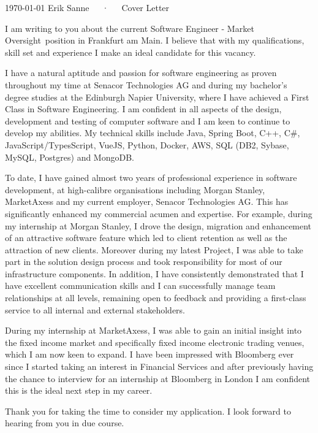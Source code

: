 \documentclass[11pt, a4paper]{awesome-cv}
\newcommand{\role}{Software Engineer - Market Oversight}
\newcommand{\location}{Frankfurt am Main}
\begin{document}
\makecvheader[R]

\makecvfooter
  {\today}
  {Erik Sanne~~~·~~~Cover Letter}
  {}

\makelettertitle

\begin{cvletter}

I am writing to you about the current \role\ position in \location. I believe that with my qualifications, skill set and experience I make an ideal candidate for this vacancy.

I have a natural aptitude and passion for software engineering as proven throughout my time at Senacor Technologies AG and during my bachelor’s degree studies at the Edinburgh Napier University, where I have achieved a First Class in Software Engineering. I am confident in all aspects of the design, development and testing of computer software and I am keen to continue to develop my abilities. My technical skills include Java, Spring Boot, C++, C\#, JavaScript/TypesScript, VueJS, Python, Docker, AWS, SQL (DB2, Sybase, MySQL, Postgres) and MongoDB.

To date, I have gained almost two years of professional experience in software development, at high-calibre organisations including Morgan Stanley, MarketAxess and my current employer, Senacor Technologies AG. This has significantly enhanced my commercial acumen and expertise. For example, during my internship at Morgan Stanley, I drove the design, migration and enhancement of an attractive software feature which led to client retention as well as the attraction of new clients. Moreover during my latest Project, I was able to take part in the solution design process and took responsibility for most of our infrastructure components. In addition, I have consistently demonstrated that I have excellent communication skills and I can successfully manage team relationships at all levels, remaining open to feedback and providing a first-class service to all internal and external stakeholders.

During my internship at MarketAxess, I was able to gain an initial insight into the fixed income market and specifically fixed income electronic trading venues, which I am now keen to expand. I have been impressed with Bloomberg ever since I started taking an interest in Financial Services and after previously having the chance to interview for an internship at Bloomberg in London I am confident this is the ideal next step in my career.

Thank you for taking the time to consider my application. I look forward to hearing from you in due course.

\end{cvletter}


\makeletterclosing
\end{document}

